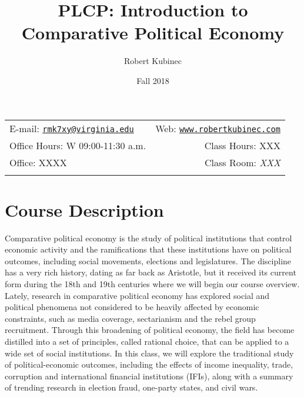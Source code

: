 \documentclass[11pt,]{article}
\title{PLCP: Introduction to Comparative Political Economy}
\author{Robert Kubinec}
\date{Fall 2018}
\begin{document}
  

		\maketitle
		
	
		\thispagestyle{firststyle}



	\noindent \begin{tabular*}{\textwidth}{ @{\extracolsep{\fill}} lr @{\extracolsep{\fill}}}


E-mail: \texttt{\href{mailto:rmk7xy@virginia.edu}{\nolinkurl{rmk7xy@virginia.edu}}} & Web: \href{http://www.robertkubinec.com}{\tt www.robertkubinec.com}\\
Office Hours: W 09:00-11:30 a.m.  &  Class Hours: XXX\\
Office: XXXX  & Class Room: \emph{XXX}\\
	&  \\
	\hline
	\end{tabular*}
	
\vspace{2mm}
	


\hypertarget{course-description}{%
\section{Course Description}\label{course-description}}

Comparative political economy is the study of political institutions
that control economic activity and the ramifications that these
institutions have on political outcomes, including social movements,
elections and legislatures. The discipline has a very rich history,
dating as far back as Aristotle, but it received its current form during
the 18th and 19th centuries where we will begin our course overview.
Lately, research in comparative political economy has explored social
and political phenomena not considered to be heavily affected by
economic constraints, such as media coverage, sectarianism and the rebel
group recruitment. Through this broadening of political economy, the
field has become distilled into a set of principles, called rational
choice, that can be applied to a wide set of social institutions. In
this class, we will explore the traditional study of political-economic
outcomes, including the effects of income inequality, trade, corruption
and international financial institutions (IFIs), along with a summary of
trending research in election fraud, one-party states, and civil wars.
\end{document}
